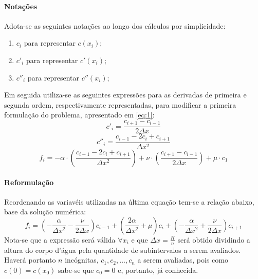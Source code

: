 \documentclass{article}
\begin{document}
        \paragraph{Notações}Adota-se as seguintes notações ao longo dos cálculos por simplicidade:
            \begin{enumerate}[noitemsep]
                \item $c_{i}$ para representar $c(x_{i})$;
                \item $c'_{i}$ para representar $c'(x_{i})$;
                \item $c''_{i}$ para representar $c''(x_{i})$;
            \end{enumerate}
        Em seguida utiliza-se as seguintes expressões para as derivadas de primeira e segunda ordem, respectivamente representadas, para modificar a primeira formulação do problema, apresentado em \eqref{eq:1}:
            \[c'_{i} = \frac{c_{i+1} - c_{i-1}}{2\Delta x}\]
            \[c''_{i} = \frac{c_{i-1} - 2c_{i} + c_{i+1}}{\Delta x^{2}}\]
            \[f_{i} = - \alpha\cdot\left(\frac{c_{i-1} - 2c_{i} + c_{i+1}}{\Delta x^{2}}\right) + \nu\cdot\left(\frac{c_{i+1} - c_{i-1}}{2\Delta x}\right) + \mu\cdot c_{1}\]

        \paragraph{Reformulação}Reordenando as variavéis utilizadas na última equação tem-se a relação abaixo, base da solução numérica: 
            \begin{equation}
                \boxed{f_{i} = \left(-\frac{\alpha}{\Delta x^{2}} - \frac{\nu}{2\Delta x}\right) c_{i-1} + \left(\frac{2\alpha}{\Delta x^{2}} + \mu\right) c_{i} + \left( - \frac{\alpha}{\Delta x^{2}} + \frac{\nu}{2\Delta x}\right) c_{i+1}}\label{eq:4}
            \end{equation}
        Nota-se que a expressão será válida $\forall x_{i}$ e que $\Delta x = \frac{H}{n}$ será obtido dividindo a altura do corpo d'água pela quantidade de subintervalos a serem avaliados. Haverá portanto $n$ incógnitas, $c_1, c_2, \dots, c_n$ a serem avaliadas, pois como $c(0) = c(x_0)$ sabe-se que $c_0 = 0$ e, portanto, já conhecida.
\end{document}
